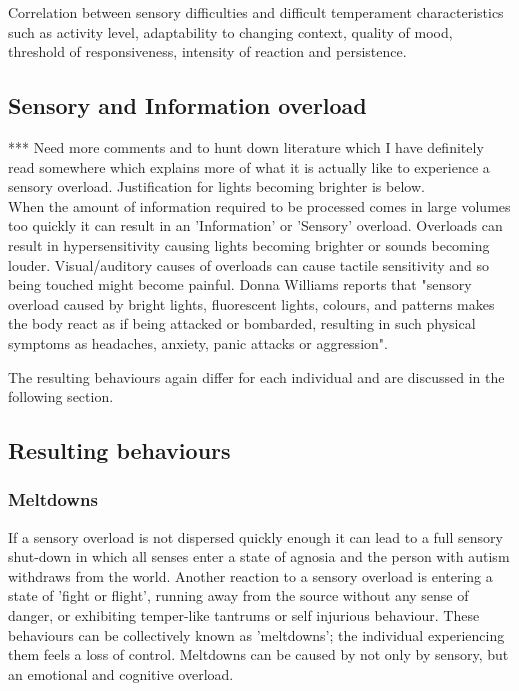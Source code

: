 \documentclass[11pt]{report}
\begin{document}
Correlation between sensory difficulties and difficult temperament characteristics such as activity level, adaptability to changing context, quality of mood, threshold of responsiveness, intensity of reaction and persistence\cite{temperament}. 

\subsection{Sensory and Information overload}

*** Need more comments and to hunt down literature which I have definitely read somewhere which explains more of what it is actually like to experience a sensory overload. Justification for lights becoming brighter is below. \\

When the amount of information required to be processed comes in large volumes too quickly it can result in an 'Information' or 'Sensory' overload. Overloads can result in hypersensitivity causing lights becoming brighter or sounds becoming louder. Visual/auditory causes of overloads can cause tactile sensitivity and so being touched might become painful. Donna Williams reports that "sensory overload caused by bright lights, fluorescent lights, colours, and patterns makes the body react as if being attacked or bombarded, resulting in such physical symptoms as headaches, anxiety, panic attacks or aggression"\cite{bayes}.

The resulting behaviours again differ for each individual and are discussed in the following section.

\subsection{Resulting behaviours}


\subsubsection{Meltdowns}
If a sensory overload is not dispersed quickly enough it can lead to a full sensory shut-down in which all senses enter a state of agnosia and the person with autism withdraws from the world. Another reaction to a sensory overload is entering a state of 'fight or flight', running away from the source without any sense of danger, or exhibiting temper-like tantrums or self injurious behaviour. These behaviours can be collectively known as 'meltdowns'; the individual experiencing them feels a loss of control. Meltdowns can be caused by not only by sensory, but an emotional and cognitive overload.
\end{document}
